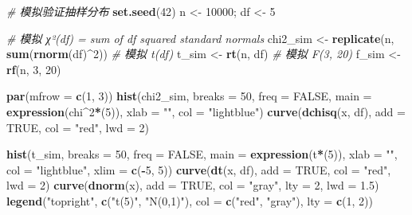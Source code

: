 \documentclass[
]{book}
\newenvironment{Shaded}{\begin{snugshade}}{\end{snugshade}}
\newcommand{\AttributeTok}[1]{\textcolor[rgb]{0.13,0.29,0.53}{#1}}
\newcommand{\CommentTok}[1]{\textcolor[rgb]{0.56,0.35,0.01}{\textit{#1}}}
\newcommand{\ConstantTok}[1]{\textcolor[rgb]{0.56,0.35,0.01}{#1}}
\newcommand{\DecValTok}[1]{\textcolor[rgb]{0.00,0.00,0.81}{#1}}
\newcommand{\FloatTok}[1]{\textcolor[rgb]{0.00,0.00,0.81}{#1}}
\newcommand{\FunctionTok}[1]{\textcolor[rgb]{0.13,0.29,0.53}{\textbf{#1}}}
\newcommand{\NormalTok}[1]{#1}
\newcommand{\OtherTok}[1]{\textcolor[rgb]{0.56,0.35,0.01}{#1}}
\newcommand{\SpecialCharTok}[1]{\textcolor[rgb]{0.81,0.36,0.00}{\textbf{#1}}}
\newcommand{\StringTok}[1]{\textcolor[rgb]{0.31,0.60,0.02}{#1}}
\begin{document}
\begin{Shaded}
\begin{Highlighting}[]
\CommentTok{\# 模拟验证抽样分布}
\FunctionTok{set.seed}\NormalTok{(}\DecValTok{42}\NormalTok{)}
\NormalTok{n }\OtherTok{\textless{}{-}} \DecValTok{10000}\NormalTok{; df }\OtherTok{\textless{}{-}} \DecValTok{5}

\CommentTok{\# 模拟 χ²(df) = sum of df squared standard normals}
\NormalTok{chi2\_sim }\OtherTok{\textless{}{-}} \FunctionTok{replicate}\NormalTok{(n, }\FunctionTok{sum}\NormalTok{(}\FunctionTok{rnorm}\NormalTok{(df)}\SpecialCharTok{\^{}}\DecValTok{2}\NormalTok{))}
\CommentTok{\# 模拟 t(df)}
\NormalTok{t\_sim }\OtherTok{\textless{}{-}} \FunctionTok{rt}\NormalTok{(n, df)}
\CommentTok{\# 模拟 F(3, 20)}
\NormalTok{f\_sim }\OtherTok{\textless{}{-}} \FunctionTok{rf}\NormalTok{(n, }\DecValTok{3}\NormalTok{, }\DecValTok{20}\NormalTok{)}

\FunctionTok{par}\NormalTok{(}\AttributeTok{mfrow =} \FunctionTok{c}\NormalTok{(}\DecValTok{1}\NormalTok{, }\DecValTok{3}\NormalTok{))}
\FunctionTok{hist}\NormalTok{(chi2\_sim, }\AttributeTok{breaks =} \DecValTok{50}\NormalTok{, }\AttributeTok{freq =} \ConstantTok{FALSE}\NormalTok{, }\AttributeTok{main =} \FunctionTok{expression}\NormalTok{(chi}\SpecialCharTok{\^{}}\DecValTok{2}\SpecialCharTok{*}\NormalTok{(}\DecValTok{5}\NormalTok{)),}
     \AttributeTok{xlab =} \StringTok{""}\NormalTok{, }\AttributeTok{col =} \StringTok{"lightblue"}\NormalTok{)}
\FunctionTok{curve}\NormalTok{(}\FunctionTok{dchisq}\NormalTok{(x, df), }\AttributeTok{add =} \ConstantTok{TRUE}\NormalTok{, }\AttributeTok{col =} \StringTok{"red"}\NormalTok{, }\AttributeTok{lwd =} \DecValTok{2}\NormalTok{)}

\FunctionTok{hist}\NormalTok{(t\_sim, }\AttributeTok{breaks =} \DecValTok{50}\NormalTok{, }\AttributeTok{freq =} \ConstantTok{FALSE}\NormalTok{, }\AttributeTok{main =} \FunctionTok{expression}\NormalTok{(t}\SpecialCharTok{*}\NormalTok{(}\DecValTok{5}\NormalTok{)),}
     \AttributeTok{xlab =} \StringTok{""}\NormalTok{, }\AttributeTok{col =} \StringTok{"lightblue"}\NormalTok{, }\AttributeTok{xlim =} \FunctionTok{c}\NormalTok{(}\SpecialCharTok{{-}}\DecValTok{5}\NormalTok{, }\DecValTok{5}\NormalTok{))}
\FunctionTok{curve}\NormalTok{(}\FunctionTok{dt}\NormalTok{(x, df), }\AttributeTok{add =} \ConstantTok{TRUE}\NormalTok{, }\AttributeTok{col =} \StringTok{"red"}\NormalTok{, }\AttributeTok{lwd =} \DecValTok{2}\NormalTok{)}
\FunctionTok{curve}\NormalTok{(}\FunctionTok{dnorm}\NormalTok{(x), }\AttributeTok{add =} \ConstantTok{TRUE}\NormalTok{, }\AttributeTok{col =} \StringTok{"gray"}\NormalTok{, }\AttributeTok{lty =} \DecValTok{2}\NormalTok{, }\AttributeTok{lwd =} \FloatTok{1.5}\NormalTok{)}
\FunctionTok{legend}\NormalTok{(}\StringTok{"topright"}\NormalTok{, }\FunctionTok{c}\NormalTok{(}\StringTok{"t(5)"}\NormalTok{, }\StringTok{"N(0,1)"}\NormalTok{), }\AttributeTok{col =} \FunctionTok{c}\NormalTok{(}\StringTok{"red"}\NormalTok{, }\StringTok{"gray"}\NormalTok{), }\AttributeTok{lty =} \FunctionTok{c}\NormalTok{(}\DecValTok{1}\NormalTok{, }\DecValTok{2}\NormalTok{))}


\end{Highlighting}
\end{Shaded}
\end{document}
